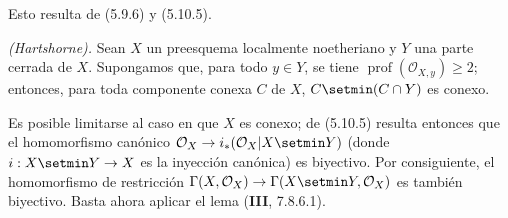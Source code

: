 Esto resulta de (5.9.6) y (5.10.5).

\begin{theorem}[5.10.7]
\label{IV.2.s5.10.7-fr}
\emph{(Hartshorne).} Sean $X$ un preesquema localmente noetheriano y $Y$ una
parte cerrada de $X$. Supongamos que, para todo $y\in Y$, se tiene
$\operatorname{prof}(\mathcal O_{X,y})\geq2$; entonces, para toda componente
conexa $C$ de $X$, $C\setmin(C\cap Y)$ es conexo.
\end{theorem}

Es posible limitarse al caso en que $X$ es conexo; de (5.10.5) resulta entonces
que el homomorfismo canónico
$\mathcal O_X\to i_*(\mathcal O_X|X\setmin Y)$ (donde $i:X\setmin Y\to X$ es la inyección
canónica) es biyectivo. Por consiguiente, el homomorfismo de restricción
$\Gamma(X,\mathcal O_X)\to\Gamma(X\setmin Y,\mathcal O_X)$ es también biyectivo.
Basta ahora aplicar el lema (\textbf{III}, 7.8.6.1).
